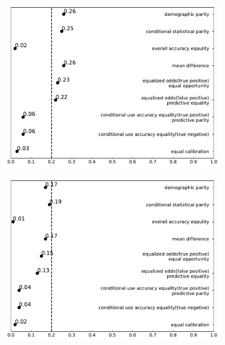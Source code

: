 \documentclass[conference]{IEEEtran}
\begin{document}
\begin{figure}[h]
    \centering
    \begin{minipage}[b]{0.48\linewidth}
        \centering
        \includegraphics[width=\linewidth]{Non-African-American}
        \label{fig:1}
    \end{minipage}
    \hfill
    \begin{minipage}[b]{0.48\linewidth}
        \centering
        \includegraphics[width=\linewidth]{Non-Caucasian}
        \label{fig:2}
    \end{minipage}
    \hfill
    \begin{minipage}[b]{0.48\linewidth}

\end{minipage}
\end{figure}
\end{document}
